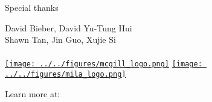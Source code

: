 \documentclass{beamer}
\begin{document}
\begin{frame}{Special thanks}
  \begin{center}
    \LARGE{
      David Bieber, David Yu-Tung Hui\\
      Shawn Tan, Jin Guo, Xujie Si\\
      \phantom{}\\
    }
    \href{https://cs.mcgill.ca}{\texttt{[image: ../../figures/mcgill\_logo.png]}}
    \href{https://mila.quebec}{\texttt{[image: ../../figures/mila\_logo.png]}}
  \end{center}
\end{frame}

\begin{frame}
  \begin{center}
    \huge{Learn more at: \\~\\
    \href{https://tidyparse.github.io}{\color{blue}{https://tidyparse.github.io}}}\\~\\
  \end{center}
\end{frame}
\end{document}

